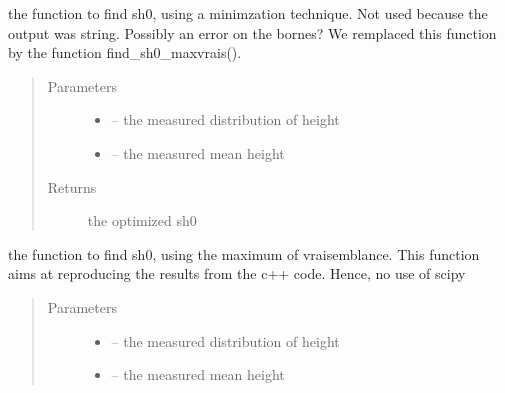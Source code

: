 \documentclass[letterpaper,10pt,english]{sphinxmanual}
\begin{document}
\begin{fulllineitems}
\begin{fulllineitems}
\end{fulllineitems}


\begin{fulllineitems}
\label{\detokenize{index:src.stathab_c.Stathab.find_sh0}}
the function to find sh0, using a minimzation technique. Not used because the output was string.
Possibly an error on the bornes? We remplaced this function by the function find\_sh0\_maxvrais().
\begin{quote}\begin{description}
\item[{Parameters}] \leavevmode\begin{itemize}
\item {} 
 -- the measured distribution of height

\item {} 
 -- the measured mean height

\end{itemize}

\item[{Returns}] \leavevmode
the optimized sh0

\end{description}\end{quote}

\end{fulllineitems}


\begin{fulllineitems}
\label{\detokenize{index:src.stathab_c.Stathab.find_sh0_maxvrais}}
the function to find sh0, using the maximum of vraisemblance.
This function aims at reproducing the results from the c++ code. Hence, no use of scipy
\begin{quote}\begin{description}
\item[{Parameters}] \leavevmode\begin{itemize}
\item {} 
 -- the measured distribution of height

\item {} 
 -- the measured mean height


\end{itemize}
\end{description}
\end{quote}
\end{fulllineitems}
\end{fulllineitems}
\end{document}
